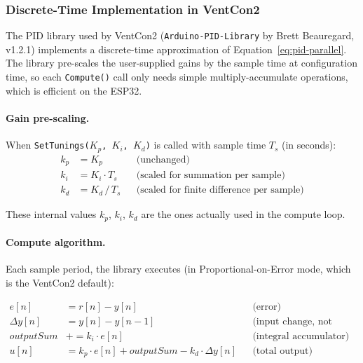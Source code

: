 \documentclass[12pt,a4paper]{article}
\begin{document}
\subsubsection{Discrete-Time Implementation in VentCon2}
\label{sec:pid-discrete}

The PID library used by VentCon2 (\texttt{Arduino-PID-Library} by Brett Beauregard, v1.2.1) implements a discrete-time approximation of Equation~\ref{eq:pid-parallel}. The library pre-scales the user-supplied gains by the sample time at configuration time, so each \texttt{Compute()} call only needs simple multiply-accumulate operations, which is efficient on the ESP32.

\paragraph{Gain pre-scaling.}
When \texttt{SetTunings($K_p$, $K_i$, $K_d$)} is called with sample time $T_s$ (in seconds):
\begin{align}
    k_p &= K_p               & &\text{(unchanged)} \label{eq:kp-internal} \\
    k_i &= K_i \cdot T_s     & &\text{(scaled for summation per sample)} \label{eq:ki-internal} \\
    k_d &= K_d \,/\, T_s     & &\text{(scaled for finite difference per sample)} \label{eq:kd-internal}
\end{align}

These internal values $k_p$, $k_i$, $k_d$ are the ones actually used in the compute loop.

\paragraph{Compute algorithm.}
Each sample period, the library executes (in Proportional-on-Error mode, which is the VentCon2 default):

\begin{align}
    e[n]          &= r[n] - y[n]                         & &\text{(error)} \\
    \Delta y[n]   &= y[n] - y[n{-}1]                     & &\text{(input change, not error change)} \\
    \mathit{outputSum} &\mathrel{+}= k_i \cdot e[n]      & &\text{(integral accumulator)} \\
    u[n]          &= k_p \cdot e[n] + \mathit{outputSum} - k_d \cdot \Delta y[n]
                                                          & &\text{(total output)}
\end{align}
\end{document}
